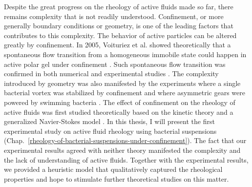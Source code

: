 Despite the great progress on the rheology of active fluids made so far, there remains complexity that is not readily understood. Confinement, or more generally boundary conditions or geometry, is one of the leading factors that contributes to this complexity. The behavior of active particles can be altered greatly by confinement. In 2005, Voituriez et al. showed theoretically that a spontaneous flow transition from a homogeneous immobile state could happen in active polar gel under confinement \cite{Voituriez2005}. Such spontaneous flow transition was confirmed in both numerical and experimental studies \cite{Ravnik2013, Wioland2016, Wu2017}. The complexity introduced by geometry was also manifested by the experiments where a single bacterial vortex was stabilized by confinement \cite{Woodhouse2012, Wioland2013, Lushi2014} and where asymmetric gears were powered by swimming bacteria
\cite{Sokolov2010, Hamby2018}. The effect of confinement on the rheology of active fluids was first studied theoretically based on the kinetic theory \cite{Alonso-Matilla2016} and a generalized Navier-Stokes model \cite{Somka2017}. In this thesis, I will present the first experimental study on active fluid rheology using bacterial suspensions (Chap.~\ref{rheology-of-bacterial-suspensions-under-confinement}). The fact that our experimental results agreed with neither theory manifested the complexity and the lack of understanding of active fluids. Together with the experimental results, we provided a heuristic model that qualitatively captured the rheological properties and hope to stimulate further theoretical studies on this matter.




